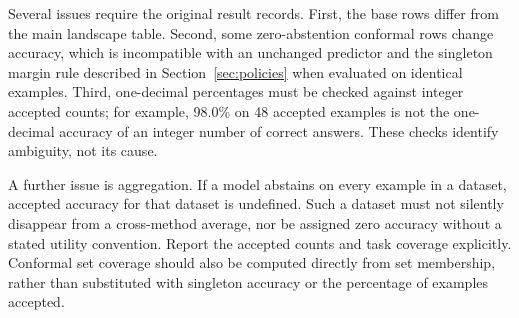 Several issues require the original result records. First, the base rows differ from the main landscape table. Second, some zero-abstention conformal rows change accuracy, which is incompatible with an unchanged predictor and the singleton margin rule described in Section~\ref{sec:policies} when evaluated on identical examples. Third, one-decimal percentages must be checked against integer accepted counts; for example, 98.0\% on 48 accepted examples is not the one-decimal accuracy of an integer number of correct answers. These checks identify ambiguity, not its cause.

A further issue is aggregation. If a model abstains on every example in a dataset, accepted accuracy for that dataset is undefined. Such a dataset must not silently disappear from a cross-method average, nor be assigned zero accuracy without a stated utility convention. Report the accepted counts and task coverage explicitly. Conformal set coverage should also be computed directly from set membership, rather than substituted with singleton accuracy or the percentage of examples accepted.


